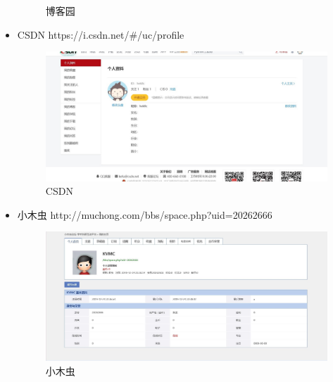 \documentclass{article}
\begin{document}
\begin{itemize}
\begin{figure}[H]
		\caption{博客园}
		\label{fig5}
		\end{figure}
    \item CSDN https://i.csdn.net/\#/uc/profile
    	\begin{figure}[H]
		\centering
		\includegraphics[width=5in]{CDSDN.jpg}
		\caption{CSDN}
		\label{fig6}
		\end{figure}
    \item 小木虫 http://muchong.com/bbs/space.php?uid=20262666
    	\begin{figure}[H]
		\centering
		\includegraphics[width=5in]{littlepeat.jpg}
		\caption{小木虫}
		\label{fig7}
		\end{figure}

\end{itemize}


\hspace*{\fill} \\



\end{document}

